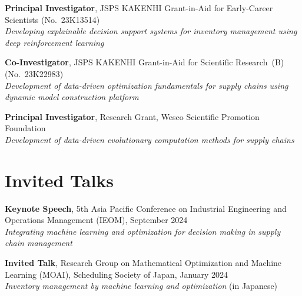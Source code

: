 \documentclass[11pt,a4paper]{article}
\newlength{\datecol}
\newenvironment{cvlist}{%
  \begin{list}{}{%
    \setlength{\leftmargin}{\datecol}%
    \setlength{\labelwidth}{\datecol}%
    \setlength{\labelsep}{0pt}%
    \setlength{\itemsep}{3pt}%
    \setlength{\parsep}{0pt}%
    \setlength{\topsep}{2pt}%
    \renewcommand{\makelabel}[1]{##1\hfil}}%
  \raggedright}%
  {\end{list}}
\begin{document}
\begin{cvlist}
\item[2023--2026] \textbf{Principal Investigator}, JSPS KAKENHI Grant-in-Aid for
  Early-Career Scientists (No.~23K13514)\\
  \textit{Developing explainable decision support systems for inventory
  management using deep reinforcement learning}
\item[2022--2026] \textbf{Co-Investigator}, JSPS KAKENHI Grant-in-Aid for
  Scientific Research~(B) (No.~23K22983)\\
  \textit{Development of data-driven optimization fundamentals for supply
  chains using dynamic model construction platform}
\item[2022--2023] \textbf{Principal Investigator}, Research Grant, Wesco
  Scientific Promotion Foundation\\
  \textit{Development of data-driven evolutionary computation methods for
  supply chains}
\end{cvlist}

\section{Invited Talks}

\begin{cvlist}
\item[2024] \textbf{Keynote Speech}, 5th Asia Pacific Conference on Industrial
  Engineering and Operations Management (IEOM), September 2024\\
  \textit{Integrating machine learning and optimization for decision making in
  supply chain management}
\item[2024] \textbf{Invited Talk}, Research Group on Mathematical Optimization
  and Machine Learning (MOAI), Scheduling Society of Japan, January 2024\\
  \textit{Inventory management by machine learning and optimization} (in Japanese)
\end{cvlist}


\end{document}
